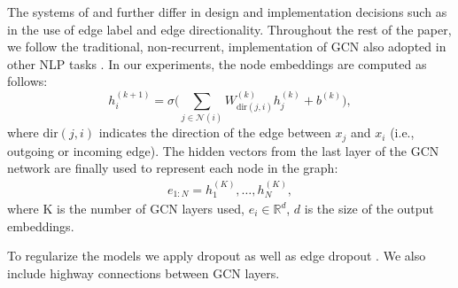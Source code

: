 \documentclass[11pt,a4paper]{article}
\begin{document}
The systems of  and  further differ in design and implementation decisions such as in the use of edge label and edge directionality. 
Throughout the rest of the paper, we follow the traditional, non-recurrent, implementation of GCN also adopted in other NLP tasks \cite{marcheggiani2017encoding,bastings2017graph,cetoli2017graph}. In our experiments, the node embeddings are computed as follows:
\begin{equation}
h_i^{(k + 1)} = \sigma \Bigg( \sum_{j \in \mathcal{N}(i)}{W_{\mathrm{dir}(j,i)}^{(k)}} h_j^{(k)} + b^{(k)} \Bigg),
\label{eq:gcn_final}
\end{equation}
where $\mathrm{dir}(j,i)$ indicates the direction of the edge between $x_j$ and $x_i$ (i.e., outgoing or incoming edge). 
The hidden vectors from the last layer of the GCN network are finally used to represent each node in the graph:
\begin{align*}
e_{1:N} = h_1^{(K)}, \dots, h_N^{(K)},
\end{align*}
where K is the number of GCN layers used, $e_i \in \mathbb{R}^{d}$, $d$ is the size of the output embeddings. 

To regularize the models we apply dropout \cite{srivastava2014dropout} as well as edge dropout \cite{marcheggiani2017encoding}. We also include highway connections \cite{srivastava2015highway} between GCN layers. 
\end{document}
